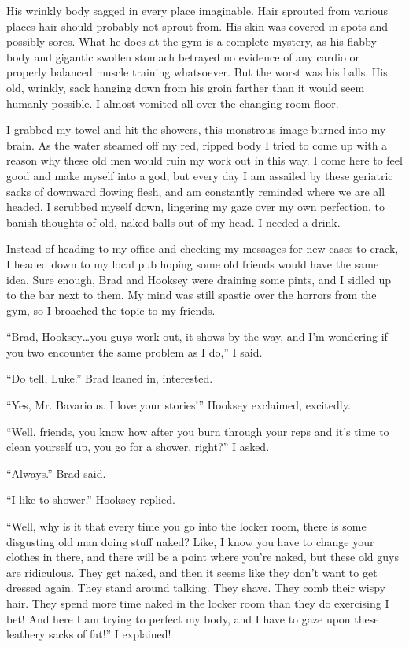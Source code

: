His wrinkly body sagged in every place imaginable. Hair sprouted
from various places hair should probably not sprout from. His skin
was covered in spots and possibly sores. What he does at the gym is
a complete mystery, as his flabby body and gigantic swollen stomach
betrayed no evidence of any cardio or properly balanced muscle
training whatsoever. But the worst was his balls. His old, wrinkly,
sack hanging down from his groin farther than it would seem humanly
possible. I almost vomited all over the changing room floor.



I grabbed my towel and hit the showers, this monstrous image burned
into my brain. As the water steamed off my red, ripped body I tried
to come up with a reason why these old men would ruin my work out
in this way. I come here to feel good and make myself into a god,
but every day I am assailed by these geriatric sacks of downward
flowing flesh, and am constantly reminded where we are all headed.
I scrubbed myself down, lingering my gaze over my own perfection,
to banish thoughts of old, naked balls out of my head. I needed a
drink.



Instead of heading to my office and checking my messages for new
cases to crack, I headed down to my local pub hoping some old
friends would have the same idea. Sure enough, Brad and Hooksey
were draining some pints, and I sidled up to the bar next to them.
My mind was still spastic over the horrors from the gym, so I
broached the topic to my friends.



``Brad, Hooksey{\ldots}you guys work out, it shows by the way, and I'm
wondering if you two encounter the same problem as I do,'' I
said.



``Do tell, Luke.'' Brad leaned in, interested.

``Yes, Mr. Bavarious. I love your stories!'' Hooksey exclaimed,
excitedly.



``Well, friends, you know how after you burn through your reps and
it's time to clean yourself up, you go for a shower, right?'' I
asked.



``Always.'' Brad said.

``I like to shower.'' Hooksey replied.



``Well, why is it that every time you go into the locker room, there
is some disgusting old man doing stuff naked? Like, I know you have
to change your clothes in there, and there will be a point where
you're naked, but these old guys are ridiculous. They get naked,
and then it seems like they don't want to get dressed again. They
stand around talking. They shave. They comb their wispy hair. They
spend more time naked in the locker room than they do exercising I
bet! And here I am trying to perfect my body, and I have to gaze
upon these leathery sacks of fat!'' I explained!



